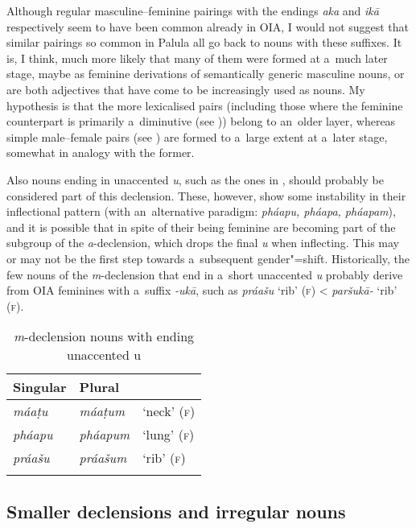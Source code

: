 Although regular masculine--feminine pairings with the endings \textit{aka} and \textit{ikā}
respectively seem to have been common already in OIA, I would not suggest that similar pairings so
common in Palula all go back to nouns with these suffixes. It is, I think, much more likely that
many of them were formed at a~much later stage, maybe as feminine derivations of semantically
generic masculine nouns, or are both adjectives that have come to be increasingly used as nouns. My
hypothesis is that the more lexicalised pairs (including those where the feminine counterpart is
primarily a~diminutive (see )) belong to an~older layer, whereas simple
male--female pairs (see ) are formed to a~large extent at a~later stage, somewhat in
analogy with the former.


Also nouns ending in unaccented \textit{u}, such as the ones in , should probably be considered part of this declension. These, however, show some instability in their inflectional pattern (with an~alternative paradigm: \textit{pháapu, pháapa, pháapam}), and it is possible that in spite of their being feminine are becoming part of the subgroup of the \textit{a}-declension, which drops the final \textit{u} when inflecting. This may or may not be the first step towards a~subsequent gender"=shift. Historically, the few nouns of the \textit{m}-declension that end in a~short unaccented \textit{u} probably derive from OIA feminines with a~suffix \textit{-ukā}, such as \textit{práašu} `rib' (\textsc{f}) {\textless} \textit{paršukā-} `rib' (\textsc{f}).


\begin{table}[ht]
\caption{\textit{m}-declension nouns with ending unaccented u}
\begin{tabularx}{\textwidth}{ Q Q Q }
\lsptoprule
Singular &
Plural &
\\\hline
\textit{máaṭu} &
\textit{máaṭum} &
`neck' (\textsc{f})\\
\textit{pháapu} &
\textit{pháapum} &
`lung' (\textsc{f})\\
\textit{práašu} &
\textit{práašum} &
`rib' (\textsc{f})\\\lspbottomrule
\end{tabularx}
\label{tab:4-17}
\end{table}


\subsection{Smaller declensions and irregular nouns}
\label{subsec:4-6-4}

